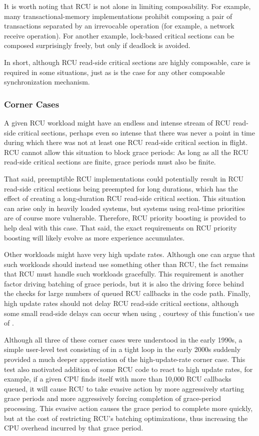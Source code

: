 It is worth noting that RCU is not alone in limiting composability. For
example, many transactional-memory implementations prohibit composing a
pair of transactions separated by an irrevocable operation (for example,
a network receive operation).
For another example, lock-based critical
sections can be composed surprisingly freely, but only if deadlock is
avoided.

In short, although RCU read-side critical sections are highly
composable, care is required in some situations, just as is the case for
any other composable synchronization mechanism.


\subsubsection{Corner Cases}

A given RCU workload might have an endless and intense stream of RCU
read-side critical sections, perhaps even so intense that there was
never a point in time during which there was not at least one RCU
read-side critical section in flight.
RCU cannot allow this situation to
block grace periods: As long as all the RCU read-side critical sections
are finite, grace periods must also be finite.

That said, preemptible RCU implementations could potentially result in
RCU read-side critical sections being preempted for long durations,
which has the effect of creating a long-duration RCU read-side critical
section.
This situation can arise only in heavily loaded systems, but
systems using real-time priorities are of course more vulnerable.
Therefore, RCU priority boosting is provided to help deal with this
case.
That said, the exact requirements on RCU priority boosting will
likely evolve as more experience accumulates.

Other workloads might have very high update rates.
Although one can
argue that such workloads should instead use something other than RCU,
the fact remains that RCU must handle such workloads gracefully.
This
requirement is another factor driving batching of grace periods, but it
is also the driving force behind the checks for large numbers of queued
RCU callbacks in the  code path.
Finally, high update
rates should not delay RCU read-side critical sections, although some
small read-side delays can occur when using
, courtesy of this function's use of
.

Although all three of these corner cases were understood in the early
1990s, a simple user-level test consisting of  in a
tight loop in the early 2000s suddenly provided a much deeper
appreciation of the high-update-rate corner case.
This test also
motivated addition of some RCU code to react to high update rates, for
example, if a given CPU finds itself with more than 10,000 RCU callbacks
queued, it will cause RCU to take evasive action by more aggressively
starting grace periods and more aggressively forcing completion of
grace-period processing.
This evasive action causes the grace period to
complete more quickly, but at the cost of restricting RCU's batching
optimizations, thus increasing the CPU overhead incurred by that grace
period.


